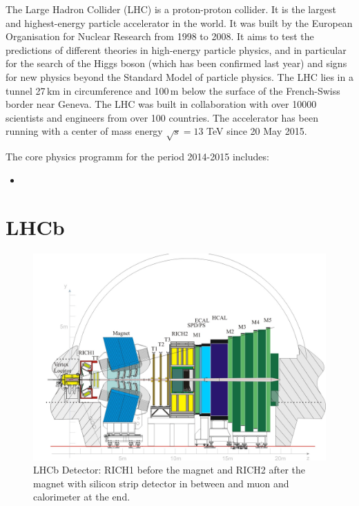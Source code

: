 \documentclass[11pt,twoside]{scrreprt}
\begin{document}
The Large Hadron Collider (LHC) is a proton-proton collider. It is the largest and highest-energy particle accelerator in the world. It was built by the European Organisation for Nuclear Research from 1998 to 2008. It aims to test the predictions of different theories in high-energy particle physics, and in particular for the search of the Higgs boson (which has been confirmed last year) and signs for new physics beyond the Standard Model of particle physics. The LHC lies in a tunnel 27\,km in circumference and 100\,m below the surface of the French-Swiss border near Geneva. The LHC was built in collaboration with over 10000 scientists and engineers from over 100 countries. The accelerator has been running with a center of mass energy $\sqrt{s} = 13$ TeV since 20 May 2015.


The core physics programm for the period 2014-2015 includes:

\begin{itemize}
  \item <COMMENT: PROGRAM>
\end{itemize}




\section{LHCb}

\begin{figure}[tb]
  \centering
  \includegraphics[width=\textwidth]{pics/lhcb_detector}
  \caption{LHCb Detector: RICH1 before the magnet and RICH2 after the magnet with silicon strip detector in between and muon and calorimeter at the end.}
  \label{fig:lhcb}
\end{figure}
\end{document}
